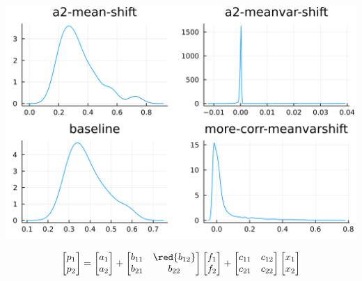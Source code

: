 \documentclass[
  ignorenonframetext,
]{beamer}
\begin{document}
\begin{frame}{}
\protect\hypertarget{section-8}{}
\begin{center}\includegraphics[width=0.95\paperheight]{complexity_files/figure-beamer/unnamed-chunk-29-1} \end{center}

\[
\begin{bmatrix}
 p_1 \\ p_2
\end{bmatrix} =
\begin{bmatrix}
 a_1 \\ {a_2}
\end{bmatrix}
 + 
 \begin{bmatrix}
 {b_{11}} & \red{b_{12}} \\
 {b_{21}} & {b_{22}}
\end{bmatrix}
\begin{bmatrix}
 f_1 \\ f_2
\end{bmatrix}
+
 \begin{bmatrix}
 c_{11} & c_{12} \\
 c_{21} & c_{22}
\end{bmatrix}
\begin{bmatrix}
 x_1 \\ x_2
\end{bmatrix}
\]
\end{frame}
\end{document}
